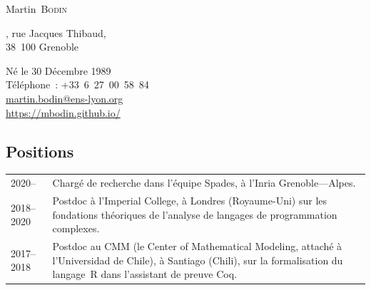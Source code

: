 \documentclass[12pt,a4paper]{article}
\makeatletter
\newcommand{\en}[1]{\foreignlanguage{english}{{#1}}}
\newcommand{\es}[1]{\foreignlanguage{spanish}{{#1}}}
\newcommand{\en}[1]{\foreignlanguage{english}{{#1}}}
\newcommand{\es}[1]{\foreignlanguage{spanish}{{#1}}}
\newenvironment{datecvsection}[1]%
               {\subsection*{#1}%
                 \noindent \begin{longtable}{@{}p{\annee}p{\texte}@{}}}
               {\end{longtable}}
\newcommand\familyName{\textsc}
\newcommand\placeName{}
\makeatother
\begin{document}
\pagestyle{empty}


\newlength{\annee}
\settowidth{\annee}{9999--9999}


\newlength{\texte}
\setlength{\texte}{\textwidth} \addtolength{\texte}{-\annee} 
	\addtolength{\texte}{-2\tabcolsep}

\begin{center} \Huge Martin~\familyName{Bodin} \end{center}

\noindent
\parbox[c]{.5\textwidth}
{
  , rue Jacques Thibaud, \\
	38~100 Grenoble
}
\parbox[c]{.5\textwidth}
{
\begin{flushright}
  Né le 30 Décembre 1989 \\
  \noindent Téléphone~: \mbox{+33 6 27 00 58 84} \\
  \url{martin.bodin@ens-lyon.org} \\
  \url{https://mbodin.github.io/}
\end{flushright}
}


\begin{datecvsection}{Positions}

		2020– & Chargé de recherche dans l’équipe \placeName{Spades}, à l’\placeName{Inria} \placeName{Grenoble}—\placeName{Alpes}. \\

    2018–2020 & Postdoc à l’\en{\placeName{Imperial College}}, à \placeName{Londres} (\placeName{Royaume-Uni}) sur les fondations théoriques de l’analyse de langages de programmation complexes. \\

    2017–2018 & Postdoc au \placeName{CMM} (le \en{\placeName{Center of Mathematical Modeling}}, attaché à l’\es{\placeName{Universidad de Chile}}), à \placeName{Santiago} (\placeName{Chili}), sur la formalisation du langage~R dans l’assistant de preuve Coq. \\

\end{datecvsection}
\end{document}
